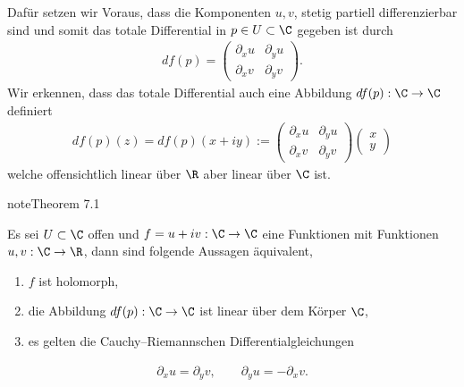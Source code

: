 \documentclass[letterpaper,10pt,german]{jupyterBook}
\begin{document}
\sphinxAtStartPar
Dafür setzen wir Voraus, dass die Komponenten \(u,v\), stetig partiell differenzierbar sind und somit das totale Differential in \(p\in U\subset\C\) gegeben ist durch
\begin{equation*}
\begin{split}df(p) = 
\begin{pmatrix} 
\partial_x u &\partial_y u\\
\partial_x v &\partial_y v
\end{pmatrix}.\end{split}
\end{equation*}
\sphinxAtStartPar
Wir erkennen, dass das totale Differential auch eine Abbildung \(df(p):\C\to\C\) definiert
\begin{equation*}
\begin{split}df(p)(z)= df(p)(x+iy):= 
\begin{pmatrix} 
\partial_x u &\partial_y u\\
\partial_x v &\partial_y v
\end{pmatrix}
\begin{pmatrix}
x\\y
\end{pmatrix}\end{split}
\end{equation*}
\sphinxAtStartPar
welche offensichtlich linear über \(\R\) aber  linear über \(\C\) ist.
\label{complexanalysis/cauchyriemann:theorem-7}
\begin{sphinxadmonition}{note}{Theorem 7.1}



\sphinxAtStartPar
Es sei \(U\subset \C\) offen und \(f=u+iv:\C\to\C\) eine Funktionen mit  Funktionen \(u,v:\C\to\R\), dann sind folgende Aussagen äquivalent,
\begin{enumerate}
%
\item {} 
\sphinxAtStartPar
\(f\) ist holomorph,

\item {} 
\sphinxAtStartPar
die Abbildung \(df(p):\C\to\C\) ist linear über dem Körper \(\C\),

\item {} 
\sphinxAtStartPar
es gelten die Cauchy–Riemannschen Differentialgleichungen

\end{enumerate}
\begin{equation*}
\begin{split}\partial_x u = \partial_y v, \qquad \partial_y u = -\partial_x v.\end{split}
\end{equation*}\end{sphinxadmonition}
\end{document}
